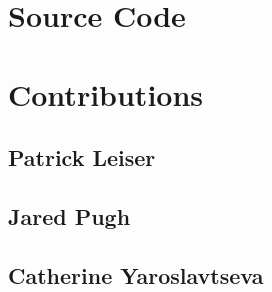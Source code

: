 \documentclass{article}
\begin{document}
\appendix

\section{Source Code}

\section{Contributions}

\subsection{Patrick Leiser}

\subsection{Jared Pugh}

\subsection{Catherine Yaroslavtseva}
\end{document}
